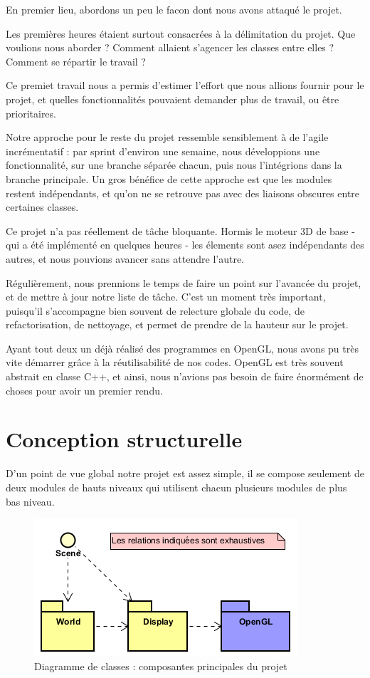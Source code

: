\documentclass{EPUProjetDi}
\begin{document}
En premier lieu, abordons un peu le facon dont nous avons attaqué le projet.

Les premières heures étaient surtout consacrées à la délimitation du projet. Que voulions nous aborder ? Comment allaient s'agencer les classes entre elles ? Comment se répartir le travail ?

Ce premiet travail nous a permis d'estimer l'effort que nous allions fournir pour le projet, et quelles fonctionnalités pouvaient demander plus de travail, ou être prioritaires.

Notre approche pour le reste du projet ressemble sensiblement à de l'agile incrémentatif : par sprint d'environ une semaine, nous développions une fonctionnalité, sur une branche séparée chacun, puis nous l'intégrions dans la branche principale. Un gros bénéfice de cette approche est que les modules restent indépendants, et qu'on ne se retrouve pas avec des liaisons obscures entre certaines classes. 

Ce projet n'a pas réellement de tâche bloquante. Hormis le moteur 3D de base - qui a été implémenté en quelques heures - les élements sont asez indépendants des autres, et nous pouvions avancer sans attendre l'autre.

Régulièrement, nous prennions le temps de faire un point sur l'avancée du projet, et de mettre à jour notre liste de tâche. C'est un moment très important, puisqu'il s'accompagne bien souvent de relecture globale du code, de refactorisation, de nettoyage, et permet de prendre de la hauteur sur le projet.


Ayant tout deux un déjà réalisé des programmes en OpenGL, nous avons pu très vite démarrer grâce à la réutilisabilité de nos codes. OpenGL est très souvent abstrait en classe C++, et ainsi, nous n'avions pas besoin de faire énormément de choses pour avoir un premier rendu.


\section{Conception structurelle}

D'un point de vue global notre projet est assez simple, il se compose seulement de deux modules de hauts niveaux qui utilisent chacun plusieurs modules de plus bas niveau.

\begin{figure}[ht]
	\centering
	\includegraphics[scale=.6]{overview_uml}
	\caption{Diagramme de classes : composantes principales du projet}
\end{figure}
\end{document}
